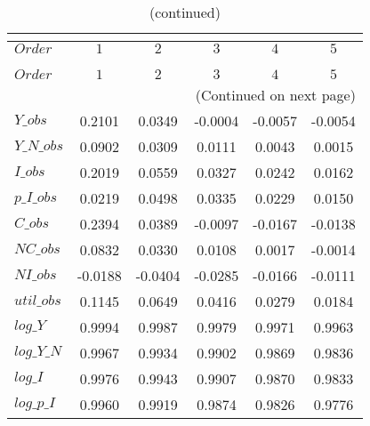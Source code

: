  
\begin{center}
\begin{longtable}{lccccc} 
\caption{COEFFICIENTS OF AUTOCORRELATION}\\
 \label{Table:th_autocorr_matrix}\\
\toprule 
$Order      $	 & 	 $          1$	 & 	 $          2$	 & 	 $          3$	 & 	 $          4$	 & 	 $          5$\\
\midrule \endfirsthead 
\caption{(continued)}\\
 \toprule \\ 
$Order      $	 & 	 $          1$	 & 	 $          2$	 & 	 $          3$	 & 	 $          4$	 & 	 $          5$\\
\midrule \endhead 
\midrule \multicolumn{6}{r}{(Continued on next page)} \\ \bottomrule \endfoot 
\bottomrule \endlastfoot 
$Y\_obs     $	 & 	     0.2101	 & 	     0.0349	 & 	    -0.0004	 & 	    -0.0057	 & 	    -0.0054 \\ 
$Y\_N\_obs  $	 & 	     0.0902	 & 	     0.0309	 & 	     0.0111	 & 	     0.0043	 & 	     0.0015 \\ 
$I\_obs     $	 & 	     0.2019	 & 	     0.0559	 & 	     0.0327	 & 	     0.0242	 & 	     0.0162 \\ 
$p\_I\_obs  $	 & 	     0.0219	 & 	     0.0498	 & 	     0.0335	 & 	     0.0229	 & 	     0.0150 \\ 
$C\_obs     $	 & 	     0.2394	 & 	     0.0389	 & 	    -0.0097	 & 	    -0.0167	 & 	    -0.0138 \\ 
$NC\_obs    $	 & 	     0.0832	 & 	     0.0330	 & 	     0.0108	 & 	     0.0017	 & 	    -0.0014 \\ 
$NI\_obs    $	 & 	    -0.0188	 & 	    -0.0404	 & 	    -0.0285	 & 	    -0.0166	 & 	    -0.0111 \\ 
$util\_obs  $	 & 	     0.1145	 & 	     0.0649	 & 	     0.0416	 & 	     0.0279	 & 	     0.0184 \\ 
$log\_Y     $	 & 	     0.9994	 & 	     0.9987	 & 	     0.9979	 & 	     0.9971	 & 	     0.9963 \\ 
$log\_Y\_N  $	 & 	     0.9967	 & 	     0.9934	 & 	     0.9902	 & 	     0.9869	 & 	     0.9836 \\ 
$log\_I     $	 & 	     0.9976	 & 	     0.9943	 & 	     0.9907	 & 	     0.9870	 & 	     0.9833 \\ 
$log\_p\_I  $	 & 	     0.9960	 & 	     0.9919	 & 	     0.9874	 & 	     0.9826	 & 	     0.9776 \\ 

\end{longtable}
\end{center}

